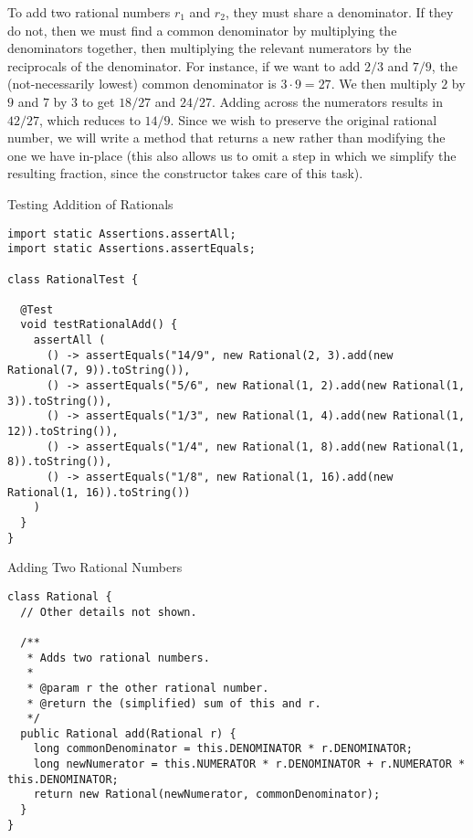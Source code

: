 To add two rational numbers $r_1$ and $r_2$, they must share a denominator. If they do not, then we must find a common denominator by multiplying the denominators together, then multiplying the relevant numerators by the reciprocals of the denominator. For instance, if we want to add $2/3$ and $7/9$, the (not-necessarily lowest) common denominator is $3\cdot{9} = 27$. We then multiply $2$ by $9$ and $7$ by $3$ to get $18/27$ and $24/27$. Adding across the numerators results in $42/27$, which reduces to $14/9$. Since we wish to preserve the original rational number, we will write a method that returns a new  rather than modifying the one we have in-place (this also allows us to omit a step in which we simplify the resulting fraction, since the constructor takes care of this task).

\begin{cl}{Testing Addition of Rationals}
\begin{lstlisting}[language=MyJava]
import static Assertions.assertAll;
import static Assertions.assertEquals;

class RationalTest {

  @Test
  void testRationalAdd() {
    assertAll (
      () -> assertEquals("14/9", new Rational(2, 3).add(new Rational(7, 9)).toString()),
      () -> assertEquals("5/6", new Rational(1, 2).add(new Rational(1, 3)).toString()),
      () -> assertEquals("1/3", new Rational(1, 4).add(new Rational(1, 12)).toString()),
      () -> assertEquals("1/4", new Rational(1, 8).add(new Rational(1, 8)).toString()),
      () -> assertEquals("1/8", new Rational(1, 16).add(new Rational(1, 16)).toString())
    )
  }
}
\end{lstlisting}
\end{cl}

\begin{cl}{Adding Two Rational Numbers}
\begin{lstlisting}[language=MyJava]
class Rational {
  // Other details not shown.

  /**
   * Adds two rational numbers.
   *
   * @param r the other rational number.
   * @return the (simplified) sum of this and r.
   */
  public Rational add(Rational r) {
    long commonDenominator = this.DENOMINATOR * r.DENOMINATOR;
    long newNumerator = this.NUMERATOR * r.DENOMINATOR + r.NUMERATOR * this.DENOMINATOR;
    return new Rational(newNumerator, commonDenominator);
  }
}
\end{lstlisting}
\end{cl}

